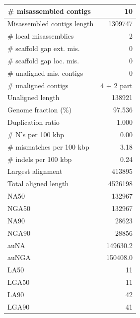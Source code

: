 \documentclass[12pt,a4paper]{article}
\begin{document}
\begin{table}[ht]
\begin{center}
\begin{tabular}{|l*{1}{|r}|}
\# misassembled contigs & 10 \\ \hline
Misassembled contigs length & 1309747 \\ \hline
\# local misassemblies & 2 \\ \hline
\# scaffold gap ext. mis. & 0 \\ \hline
\# scaffold gap loc. mis. & 0 \\ \hline
\# unaligned mis. contigs & 0 \\ \hline
\# unaligned contigs & 4 + 2 part \\ \hline
Unaligned length & 138921 \\ \hline
Genome fraction (\%) & 97.536 \\ \hline
Duplication ratio & 1.000 \\ \hline
\# N's per 100 kbp & 0.00 \\ \hline
\# mismatches per 100 kbp & 3.18 \\ \hline
\# indels per 100 kbp & 0.24 \\ \hline
Largest alignment & 413895 \\ \hline
Total aligned length & 4526198 \\ \hline
NA50 & 132967 \\ \hline
NGA50 & 132967 \\ \hline
NA90 & 28623 \\ \hline
NGA90 & 28856 \\ \hline
auNA & 149630.2 \\ \hline
auNGA & 150408.0 \\ \hline
LA50 & 11 \\ \hline
LGA50 & 11 \\ \hline
LA90 & 42 \\ \hline
LGA90 & 41 \\ \hline
\end{tabular}
\end{center}
\end{table}
\end{document}
